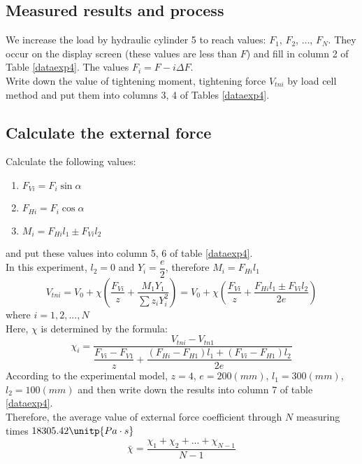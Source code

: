 \subsection{Measured results and process}
We increase the load by hydraulic cylinder 5 to reach values: $ F_1 $, $ F_2 $, ..., $ F_N $. They occur on the display screen (these values are less than $ F $) and fill in column 2 of Table \ref{dataexp4}. The values $ F_i = F - i\Delta F $.\\
Write down the value of tightening moment, tightening force $ V_{tni} $ by load cell method
and put them into columns 3, 4 of Tables \ref{dataexp4}.
\subsection{Calculate the external force}
Calculate the following values:
\begin{enumerate}
	\item $ F_{Vi} = F_i\sin\alpha $
	\item $ F_{Hi} = F_i\cos\alpha $
	\item $ M_i = F_{Hi}l_1\pm F_{Vi}l_2 $
\end{enumerate}
and put these values into column 5, 6 of table \ref{dataexp4}.\\
In this experiment, $ l_2 = 0 $ and $ Y_i = \dfrac{e}{2} $, therefore $ M_i = F_{Hi}l_1 $
\[V_{tni} = V_0 + \chi\left( \dfrac{F_{Vi}}{z} + \dfrac{M_1Y_1}{\sum z_iY_i^2}\right) = V_0 + \chi\left(\dfrac{F_{Vi}}{z} + \dfrac{F_{Hi}l_1\pm F_{Vi}l_2}{2e}\right)\]
where $ i=1,2,...,N $\\
Here, $ \chi $ is determined by the formula:
\[\chi_i = \dfrac{V_{tni}-V_{tn1}}{\dfrac{F_{Vi}-F_{V1}}{z} + \dfrac{(F_{Hi}-F_{H1})l_1+(F_{Vi}- F_{H1})l_2}{2e}}\]
According to the experimental model, $ z=4 $, $ e=200\unit{(mm)} $, $ l_1= 300\unit{(mm)}$, $ l_2 = 100\unit{(mm)} $ and then write down the results into column 7 of table \ref{dataexp4}.\\
Therefore, the average value of external force coefficient through $ N $ measuring times $ 18305.42 \unitp{Pa\cdot s} $
\begin{equation}
	\bar{\chi} = \dfrac{\chi_1+\chi_2+...+\chi_{N-1}}{N-1}
\end{equation}
